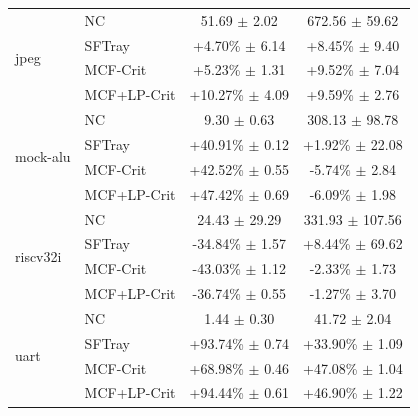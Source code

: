 \begin{table}[t]
\begin{tabular}{llcc}
\midrule
\multirow{4}{*}{jpeg} & NC & 51.69 $\pm$ 2.02 & 672.56 $\pm$ 59.62 \\
 & SFTray & +4.70\% $\pm$ 6.14 & +8.45\% $\pm$ 9.40 \\
 & MCF-Crit & +5.23\% $\pm$ 1.31 & +9.52\% $\pm$ 7.04 \\
 & MCF+LP-Crit & +10.27\% $\pm$ 4.09 & +9.59\% $\pm$ 2.76 \\
\midrule
\multirow{4}{*}{mock-alu} & NC & 9.30 $\pm$ 0.63 & 308.13 $\pm$ 98.78 \\
 & SFTray & +40.91\% $\pm$ 0.12 & +1.92\% $\pm$ 22.08 \\
 & MCF-Crit & +42.52\% $\pm$ 0.55 & -5.74\% $\pm$ 2.84 \\
 & MCF+LP-Crit & +47.42\% $\pm$ 0.69 & -6.09\% $\pm$ 1.98 \\
\midrule
\multirow{4}{*}{riscv32i} & NC & 24.43 $\pm$ 29.29 & 331.93 $\pm$ 107.56 \\
 & SFTray & -34.84\% $\pm$ 1.57 & +8.44\% $\pm$ 69.62 \\
 & MCF-Crit & -43.03\% $\pm$ 1.12 & -2.33\% $\pm$ 1.73 \\
 & MCF+LP-Crit & -36.74\% $\pm$ 0.55 & -1.27\% $\pm$ 3.70 \\
\midrule
\multirow{4}{*}{uart} & NC & 1.44 $\pm$ 0.30 & 41.72 $\pm$ 2.04 \\
 & SFTray & +93.74\% $\pm$ 0.74 & +33.90\% $\pm$ 1.09 \\
 & MCF-Crit & +68.98\% $\pm$ 0.46 & +47.08\% $\pm$ 1.04 \\
 & MCF+LP-Crit & +94.44\% $\pm$ 0.61 & +46.90\% $\pm$ 1.22 \\
\midrule
\bottomrule
\end{tabular}
\end{table}